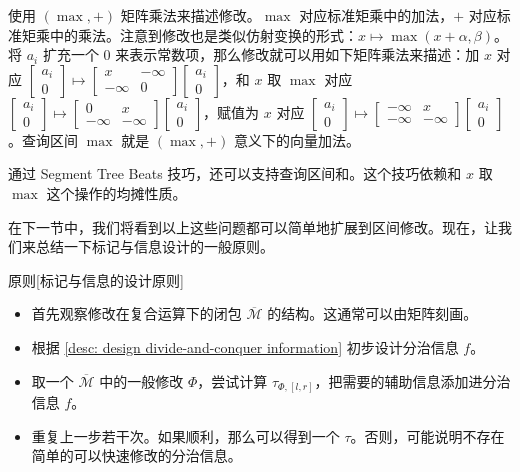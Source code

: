 \begin{solution}
    使用 $(\max,+)$ 矩阵乘法来描述修改。$\max$ 对应标准矩乘中的加法，$+$ 对应标准矩乘中的乘法。注意到修改也是类似仿射变换的形式：$x\mapsto \max(x+\alpha,\beta)$。将 $a_i$ 扩充一个 $0$ 来表示常数项，那么修改就可以用如下矩阵乘法来描述：加 $x$ 对应 $\begin{bmatrix}a_i\\0\end{bmatrix}\mapsto \begin{bmatrix}x&-\infty\\-\infty&0\end{bmatrix}\begin{bmatrix}a_i\\0\end{bmatrix}$，和 $x$ 取 $\max$ 对应 $\begin{bmatrix}a_i\\0\end{bmatrix}\mapsto \begin{bmatrix}0&x\\-\infty&-\infty\end{bmatrix}\begin{bmatrix}a_i\\0\end{bmatrix}$，赋值为 $x$ 对应 $\begin{bmatrix}a_i\\0\end{bmatrix}\mapsto \begin{bmatrix}-\infty&x\\-\infty&-\infty\end{bmatrix}\begin{bmatrix}a_i\\0\end{bmatrix}$。查询区间 $\max$ 就是 $(\max,+)$ 意义下的向量加法。
\end{solution}
\begin{remark}
    通过 Segment Tree Beats 技巧，还可以支持查询区间和。这个技巧依赖和 $x$ 取 $\max$ 这个操作的均摊性质。
\end{remark}

在下一节中，我们将看到以上这些问题都可以简单地扩展到区间修改。现在，让我们来总结一下标记与信息设计的一般原则。

\begin{descbox}{原则}[标记与信息的设计原则]
    \begin{itemize}
        \item 首先观察修改在复合运算下的闭包 $\overline{\mathcal M}$ 的结构。这通常可以由矩阵刻画。
        \item 根据 \cref{desc: design divide-and-conquer information} 初步设计分治信息 $f$。
        \item 取一个 $\overline{\mathcal M}$ 中的一般修改 $\Phi$，尝试计算 $\tau_{\Phi,[l,r]}$，把需要的辅助信息添加进分治信息 $f$。
        \item 重复上一步若干次。如果顺利，那么可以得到一个 $\tau$。否则，可能说明不存在简单的可以快速修改的分治信息。
    \end{itemize}
\end{descbox}

